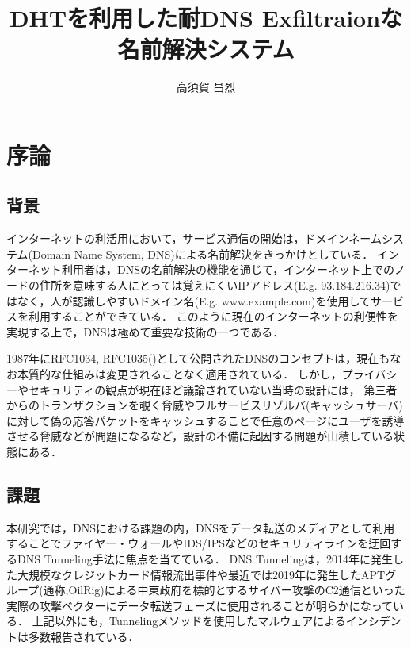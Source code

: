 \documentclass[12pt]{jarticle} %
\title{DHTを利用した耐DNS Exfiltraionな\\名前解決システム}
\author{高須賀 昌烈}
\begin{document}
\titlepage
\cmemberspage
\firstabstract
\secondabstract



\toc
\newpage
\listoffigures
\listoftables



\newpage
{}
\section{序論}
\subsection{背景}
インターネットの利活用において，サービス通信の開始は，ドメインネームシステム(Domain Name System, DNS)による名前解決をきっかけとしている．
インターネット利用者は，DNSの名前解決の機能を通じて，インターネット上でのノードの住所を意味する人にとっては覚えにくいIPアドレス(E.g. 93.184.216.34)ではなく，人が認識しやすいドメイン名(E.g. www.example.com)を使用してサービスを利用することができている．
このように現在のインターネットの利便性を実現する上で，DNSは極めて重要な技術の一つである．

1987年にRFC1034, RFC1035(\cite{rfc1034, rfc1035})として公開されたDNSのコンセプトは，現在もなお本質的な仕組みは変更されることなく適用されている．
しかし，プライバシーやセキュリティの観点が現在ほど議論されていない当時の設計には，
第三者からのトランザクションを覗く脅威やフルサービスリゾルバ(キャッシュサーバ)に対して偽の応答パケットをキャッシュすることで任意のページにユーザを誘導させる脅威などが問題になるなど，設計の不備に起因する問題が山積している状態にある．

\subsection{課題}
本研究では，DNSにおける課題の内，DNSをデータ転送のメディアとして利用することでファイヤー・ウォールやIDS/IPSなどのセキュリティラインを迂回するDNS Tunneling手法に焦点を当てている．
DNS Tunnelingは，2014年に発生した大規模なクレジットカード情報流出事件\cite{frameworkpos}や最近では2019年に発生したAPTグループ(通称,OilRig)による中東政府を標的とするサイバー攻撃のC2通信\cite{bondupdater}といった実際の攻撃ベクターにデータ転送フェーズに使用されることが明らかになっている．
上記以外にも，Tunnelingメソッドを使用したマルウェアによるインシデントは多数報告されている\cite{bernhardpos, multigrainpos, pisloader, denis, dnsmessenger, udpos}．
\end{document}
